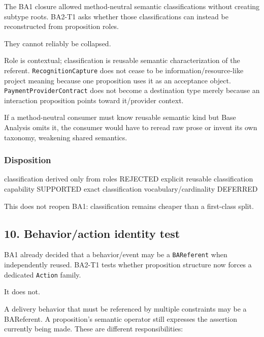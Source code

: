 \documentclass[
  10pt,
  letterpaper,
]{article}
\newenvironment{Shaded}{}{}
\newcommand{\NormalTok}[1]{#1}
\begin{document}
The BA1 closure allowed method-neutral semantic classifications without
creating subtype roots. BA2-T1 asks whether those classifications can
instead be reconstructed from proposition roles.

They cannot reliably be collapsed.

Role is contextual; classification is reusable semantic characterization
of the referent. \texttt{RecognitionCapture} does not cease to be
information/resource-like project meaning because one proposition uses
it as an acceptance object. \texttt{PaymentProviderContract} does not
become a destination type merely because an interaction proposition
points toward it/provider context.

If a method-neutral consumer must know reusable semantic kind but Base
Analysis omits it, the consumer would have to reread raw prose or invent
its own taxonomy, weakening shared semantics.

\subsubsection{Disposition}\label{disposition-5}

\begin{Shaded}
\begin{Highlighting}[]
\NormalTok{classification derived only from roles         REJECTED}
\NormalTok{explicit reusable classification capability     SUPPORTED}
\NormalTok{exact classification vocabulary/cardinality     DEFERRED}
\end{Highlighting}
\end{Shaded}

This does not reopen BA1: classification remains cheaper than a
first-class split.

\subsection{10. Behavior/action identity
test}\label{behavioraction-identity-test}

BA1 already decided that a behavior/event may be a \texttt{BAReferent}
when independently reused. BA2-T1 tests whether proposition structure
now forces a dedicated \texttt{Action} family.

It does not.

A delivery behavior that must be referenced by multiple constraints may
be a BAReferent. A proposition's semantic operator still expresses the
assertion currently being made. These are different responsibilities:
\end{document}
